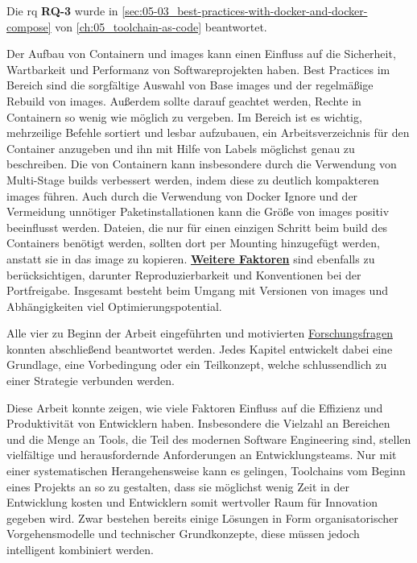 Die \acrlong{rq} \textbf{RQ-3} wurde in \autoref{sec:05-03_best-practices-with-docker-and-docker-compose} von \autoref{ch:05_toolchain-as-code} beantwortet.

Der Aufbau von Containern und \Glspl{image} kann einen Einfluss auf die Sicherheit, Wartbarkeit und Performanz von Softwareprojekten haben. Best Practices im Bereich \textbf{} sind die sorgfältige Auswahl von Base \Glspl{image} und der regelmäßige Rebuild von \Glspl{image}. Außerdem sollte darauf geachtet werden, Rechte in Containern so wenig wie möglich zu vergeben. Im Bereich \textbf{} ist es wichtig, mehrzeilige Befehle sortiert und lesbar aufzubauen, ein Arbeitsverzeichnis für den Container anzugeben und ihn mit Hilfe von Labels möglichst genau zu beschreiben. Die \textbf{} von Containern kann insbesondere durch die Verwendung von Multi-Stage \Glspl{build} verbessert werden, indem diese zu deutlich kompakteren \Glspl{image} führen. Auch durch die Verwendung von Docker Ignore und der Vermeidung unnötiger Paketinstallationen kann die Größe von \Glspl{image} positiv beeinflusst werden. Dateien, die nur für einen einzigen Schritt beim \Gls{build} des Containers benötigt werden, sollten dort per Mounting hinzugefügt werden, anstatt sie in das \Gls{image} zu kopieren. \textbf{\hyperref[subsec:05-03-04_further]{Weitere Faktoren}} sind ebenfalls zu berücksichtigen, darunter Reproduzierbarkeit und Konventionen bei der Portfreigabe. Insgesamt besteht beim Umgang mit Versionen von \Glspl{image} und Abhängigkeiten viel Optimierungspotential.

\vspace{2em}

Alle vier zu Beginn der Arbeit eingeführten und motivierten \hyperref[sec:01-03_objectives-and-research-questions]{Forschungsfragen} konnten abschließend beantwortet werden. Jedes Kapitel entwickelt dabei eine Grundlage, eine Vorbedingung oder ein Teilkonzept, welche schlussendlich zu einer Strategie verbunden werden.

Diese Arbeit konnte zeigen, wie viele Faktoren Einfluss auf die Effizienz und Produktivität von Entwicklern haben. Insbesondere die Vielzahl an Bereichen und die Menge an Tools, die Teil des modernen Software Engineering sind, stellen vielfältige und herausfordernde Anforderungen an Entwicklungsteams. Nur mit einer systematischen Herangehensweise kann es gelingen, Toolchains vom Beginn eines Projekts an so zu gestalten, dass sie möglichst wenig Zeit in der Entwicklung kosten und Entwicklern somit wertvoller Raum für Innovation gegeben wird. Zwar bestehen bereits einige Lösungen in Form organisatorischer Vorgehensmodelle und technischer Grundkonzepte, diese müssen jedoch intelligent kombiniert werden.

